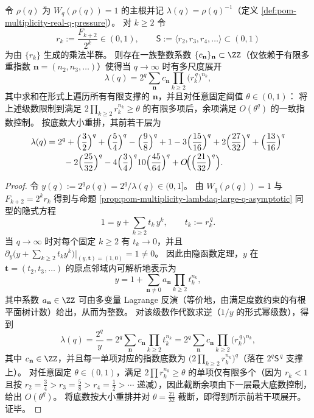 \begin{proposition}\label{prop:pom-multiplicity-lambdaq-large-q-transseries}
令 \(\rho(q)\) 为 \(W_q(\rho(q))=1\) 的主根并记 \(\lambda(q)=\rho(q)^{-1}\)（定义 \ref{def:pom-multiplicity-real-q-pressure}）。
对 \(k\ge 2\) 令
\[
r_k:=\frac{F_{k+2}}{2^k}\in(0,1),
\qquad
\mathsf S:=\bigl\langle r_2,r_3,r_4,\dots\bigr\rangle\subset(0,1)
\]
为由 \(\{r_k\}\) 生成的乘法半群。
则存在一族整数系数 \(\{c_{\mathbf n}\}_{\mathbf n}\subset\ZZ\)（仅依赖于有限多重指数 \(\mathbf n=(n_2,n_3,\dots)\)）使得当 \(q\to\infty\) 时有多尺度展开
\[
\boxed{\;
\lambda(q)=2^q\sum_{\mathbf n}c_{\mathbf n}\prod_{k\ge 2}\bigl(r_k^{\,q}\bigr)^{n_k},\;}
\]
其中求和在形式上遍历所有有限支撑的 \(\mathbf n\)，并且对任意固定阈值 \(\theta\in(0,1)\)：
将上述级数限制到满足 \(2\prod_{k\ge 2}r_k^{n_k}\ge \theta\) 的有限多项后，余项满足 \(O(\theta^q)\) 的一致指数控制。
按底数大小重排，其前若干层为
\[
\begin{aligned}
\lambda(q)
&=2^q+\Bigl(\frac32\Bigr)^{q}+\Bigl(\frac54\Bigr)^{q}-\Bigl(\frac98\Bigr)^{q}+1
-3\Bigl(\frac{15}{16}\Bigr)^{q}+2\Bigl(\frac{27}{32}\Bigr)^{q}+\Bigl(\frac{13}{16}\Bigr)^{q}\\
&\qquad-2\Bigl(\frac{25}{32}\Bigr)^{q}-4\Bigl(\frac34\Bigr)^{q}
10\Bigl(\frac{45}{64}\Bigr)^{q}+O\!\Bigl(\Bigl(\frac{21}{32}\Bigr)^{q}\Bigr).
\end{aligned}
\]
\end{proposition}
\begin{proof}
令
\(
y(q):=2^q\rho(q)=2^q/\lambda(q)\in(0,1]
\)。
由 \(W_q(\rho(q))=1\) 与 \(F_{k+2}=2^k r_k\) 得到与命题 \ref{prop:pom-multiplicity-lambdaq-large-q-asymptotic} 同型的隐式方程
\[
1=y+\sum_{k\ge 2}t_k\,y^k,\qquad t_k:=r_k^{\,q}.
\]
当 \(q\to\infty\) 时对每个固定 \(k\ge 2\) 有 \(t_k\to 0\)，并且
\(
\partial_y\bigl(y+\sum_{k\ge 2}t_k y^k\bigr)\big|_{(y,\mathbf t)=(1,0)}=1\neq 0
\)。
因此由隐函数定理，\(y\) 在 \(\mathbf t=(t_2,t_3,\dots)\) 的原点邻域内可解析地表示为
\[
y=1+\sum_{\mathbf n\neq 0}a_{\mathbf n}\prod_{k\ge 2}t_k^{n_k},
\]
其中系数 \(a_{\mathbf n}\in\ZZ\) 可由多变量 Lagrange 反演（等价地，由满足度数约束的有根平面树计数）给出，从而为整数。
对该级数作代数求逆（\(1/y\) 的形式幂级数），得到
\[
\lambda(q)=\frac{2^q}{y}
=2^q\sum_{\mathbf n}c_{\mathbf n}\prod_{k\ge 2}t_k^{n_k}
=2^q\sum_{\mathbf n}c_{\mathbf n}\prod_{k\ge 2}\bigl(r_k^{\,q}\bigr)^{n_k},
\]
其中 \(c_{\mathbf n}\in\ZZ\)，并且每一单项对应的指数底数为 \(\bigl(2\prod_{k\ge 2}r_k^{n_k}\bigr)^q\)（落在 \(2^q\mathsf S^{\,q}\) 支撑上）。
对任意固定 \(\theta\in(0,1)\)，满足 \(2\prod r_k^{n_k}\ge \theta\) 的单项仅有限多个（因为 \(r_k<1\) 且按 \(r_2=\frac34>r_3=\frac58>r_4=\frac12>\cdots\) 递减），因此截断余项由下一层最大底数控制，给出 \(O(\theta^q)\)。
将底数按大小重排并对 \(\theta=\frac{21}{32}\) 截断，即得到所示前若干项展开。证毕。
\end{proof}

